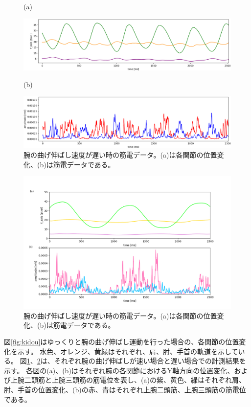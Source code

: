 \documentclass{jsarticle}
\begin{document}
\begin{figure}[htbp]
(a)

\includegraphics[width=17cm]{graph_image/fast_position.png}

(b)	

		\includegraphics[width=17cm]{graph_image/fast_EMG.png}
		\caption{腕の曲げ伸ばし速度が遅い時の筋電データ。(a)は各関節の位置変化、(b)は筋電データである。}
		\label{fig:fast}	

\end{figure}
\clearpage

\begin{figure}[htbp]
	\includegraphics[width=17cm]{graph_image/slow_position_EMG.png}
	\caption{腕の曲げ伸ばし速度が遅い時の筋電データ。(a)は各関節の位置変化、(b)は筋電データである。}
	\label{fig:slow}		
\end{figure}

図\ref{fig:kidou}はゆっくりと腕の曲げ伸ばし運動を行った場合の、各関節の位置変化を示す。
水色、オレンジ、黄緑はそれぞれ、肩、肘、手首の軌道を示している。
図\ref{fig:fast}、\ref{fig:slow}は、それぞれ腕の曲げ伸ばしが速い場合と遅い場合での計測結果を示す。
各図の(a)、(b)はそれぞれ腕の各関節におけるY軸方向の位置変化、および上腕二頭筋と上腕三頭筋の筋電位を表し、(a)の紫、黄色、緑はそれぞれ肩、肘、手首の位置変化、(b)の赤、青はそれぞれ上腕二頭筋、上腕三頭筋の筋電位である。
\end{document}
